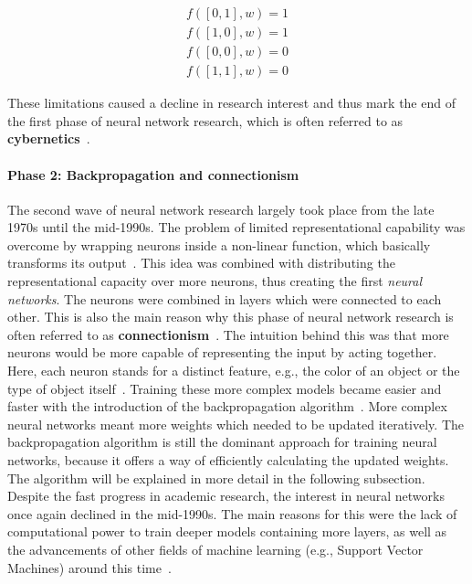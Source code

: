 \begin{align}
  f ([0, 1], w) = 1\\
  f ([1, 0], w) = 1\\
  f ([0, 0], w) = 0\\
  f ([1, 1], w) = 0
\end{align}

These limitations caused a decline in research interest and thus mark the end
of the first phase of neural network research, which is often referred to
as \textbf{cybernetics}~\cite{Goodfellow2016}.

\paragraph{Phase 2: Backpropagation and connectionism}

The second wave of neural network research largely took place from the late
1970s until the mid-1990s. 
The problem of limited representational capability was overcome by wrapping
neurons inside a non-linear function, which basically transforms its output~\cite{Fukushima1975}.
This idea was combined with distributing the representational capacity over
more neurons, thus creating the first \textit{neural networks}. 
The neurons were combined in layers which were connected to each other.
This is also the main reason why this phase of neural network research is
often referred to as \textbf{connectionism}~\cite{Goodfellow2016}.
The intuition behind this was that more neurons would be more capable of
representing the input by acting together. 
Here, each neuron stands for a distinct feature, e.g., the color of an object
or the type of object itself~\cite{Rumelhart1986a}.
Training these more complex models became easier and faster with the
introduction of the backpropagation algorithm~\cite{Rumelhart1986}.
More complex neural networks meant more weights which needed to be updated
iteratively. 
The backpropagation algorithm is still the dominant approach for training
neural networks, because it offers a way of efficiently calculating the
updated weights.
The algorithm will be explained in more detail in the following subsection.
Despite the fast progress in academic research, the interest in neural networks
once again declined in the mid-1990s. The main reasons for this were the
lack of computational power to train deeper models containing more layers, as 
well as the advancements of other fields of machine learning (e.g., Support
Vector Machines) around this time~\cite{Goodfellow2016}.



